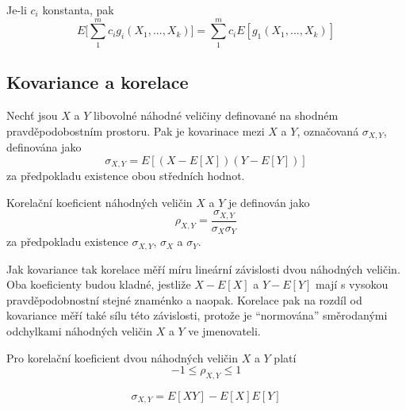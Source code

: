 \begin{theorem}
Je-li $c_i$ konstanta, pak
\begin{equation*}
E \big[\sum_1^m c_i g_i(X_1, ..., X_k) \big] = \sum_1^m c_i E[g_1(X_1, ..., X_k)]
\end{equation*}
\end{theorem}

\subsection{Kovariance a korelace}

\begin{definition}
Nechť jsou $X$ a $Y$ libovolné náhodné veličiny definované na shodném pravděpodobostním prostoru. Pak je kovarinace mezi $X$ a $Y$, označovaná $\sigma_{X,Y}$, definována jako
\begin{equation*}
\sigma_{X,Y} = E[(X -E[X])(Y - E[Y])]
\end{equation*}
za předpokladu existence obou středních hodnot.
\end{definition}

\begin{definition}
Korelační koeficient náhodných veličin $X$ a $Y$ je definován jako
\begin{equation*}
\rho_{X,Y} = \frac{\sigma_{X,Y}}{\sigma_X \sigma_Y}
\end{equation*}
za předpokladu existence $\sigma_{X,Y}$, $\sigma_{X}$ a $\sigma_{Y}$.
\end{definition}

Jak kovariance tak korelace měří míru lineární závislosti dvou náhodných veličin. Oba koeficienty budou kladné, jestliže $X - E[X]$ a $Y - E[Y]$ mají s vysokou pravděpodobnostní stejné znaménko a naopak. Korelace pak na rozdíl od kovariance měří také sílu této závislosti, protože je ``normována'' směrodanými odchylkami náhodných veličin $X$ a $Y$ ve jmenovateli.

\begin{theorem}
Pro korelační koeficient dvou náhodných veličin $X$ a $Y$ platí
\begin{equation*}
-1 \le \rho_{X,Y} \le 1
\end{equation*}
\end{theorem}

\begin{theorem}
\begin{equation*}
\sigma_{X,Y} = E[XY] - E[X]E[Y]
\end{equation*}
\end{theorem}

